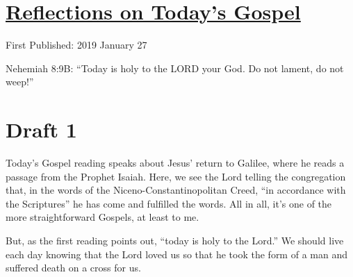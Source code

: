 \documentclass[12pt]{article}[titlepage]
\newcommand{\say}[1]{``#1''}
\newcommand{\1}{\={a}}
\newcommand{\2}{\={e}}
\newcommand{\3}{\={\i}}
\newcommand{\4}{\=o}
\newcommand{\5}{\=u}
\newcommand{\6}{\={A}}
\renewcommand{\,}{\textsuperscript{,}}
\begin{document}
\doublespacing
\section{\href{reflections-on-readings-3-ordinary-c.html}{Reflections on Today's Gospel}}
First Published: 2019 January 27

Nehemiah 8:9B: \say{Today is holy to the LORD your God. Do not lament, do not weep!}

\section{Draft 1}
Today's Gospel reading speaks about Jesus' return to Galilee, where he reads a passage from the Prophet Isaiah.
Here, we see the Lord telling the congregation that, in the words of the Niceno-Constantinopolitan Creed, \say{in accordance with the Scriptures} he has come and fulfilled the words.
All in all, it's one of the more straightforward Gospels, at least to me.

But, as the first reading points out, \say{today is holy to the Lord.}
We should live each day knowing that the Lord loved us so that he took the form of a man and suffered death on a cross for us.
\end{document}

